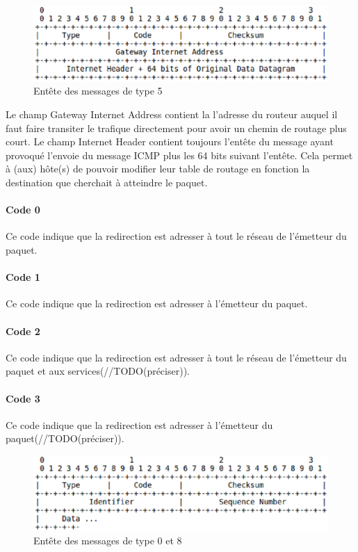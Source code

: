 \begin{figure}
\centering
\includegraphics[width=15cm]{./pics/header2.eps}
\caption{Entête des messages de type 5}
\label{fig:head2icmp}
\end{figure}
Le champ Gateway Internet Address contient la l'adresse du routeur auquel il
faut faire transiter le trafique directement pour avoir un chemin de routage
plus court.  Le champ Internet Header contient toujours l'entête du message
ayant provoqué l'envoie du message ICMP plus les 64 bits suivant l'entête. Cela
permet à (aux) hôte(s) de pouvoir modifier leur table de routage en fonction la
destination que cherchait à atteindre le paquet.

\paragraph{Code 0}
Ce code indique que la redirection est adresser à tout le réseau de l'émetteur du
paquet.

\paragraph{Code 1}
Ce code indique que la redirection est adresser à l'émetteur du paquet.

\paragraph{Code 2}
Ce code indique que la redirection est adresser à tout le réseau de l'émetteur
du paquet et aux services(//TODO(préciser)).

\paragraph{Code 3} Ce code indique que la redirection est adresser à l'émetteur
du paquet(//TODO(préciser)).

\begin{figure}
\centering
\includegraphics[width=15cm]{./pics/header3.eps}
\caption{Entête des messages de type 0 et 8}
\label{fig:head3icmp}
\end{figure}

